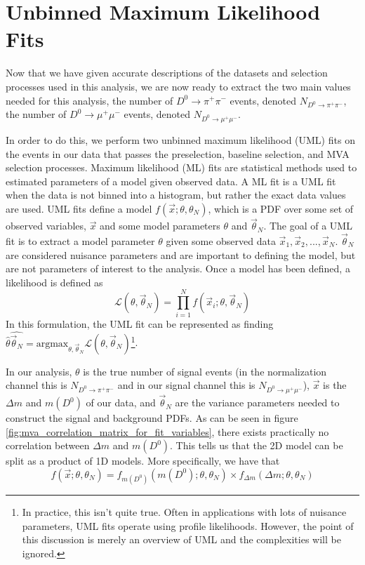 \section{Unbinned Maximum Likelihood Fits}
\label{sec:UML}

Now that we have given accurate descriptions of the datasets and selection processes used in this analysis, we are now ready to extract the two main values needed for this analysis, the number of $D^0 \to \pi^+ \pi^-$ events, denoted $N_{D^0 \to \pi^+ \pi^-}$, the number of $D^0 \to \mu^+ \mu^-$ events, denoted $N_{D^0 \to \mu^+ \mu^-}$.

In order to do this, we perform two unbinned maximum likelihood (UML) fits on the events in our data that passes the preselection, baseline selection, and MVA selection processes. Maximum likelihood (ML) fits are statistical methods used to estimated parameters of a model given observed data. A ML fit is a UML fit when the data is not binned into a histogram, but rather the exact data values are used. UML fits define a model $f(\vec{x}; \theta, \theta_N)$, which is a PDF over some set of observed variables, $\vec{x}$ and some model parameters $\theta$ and $\vec{\theta}_N$. The goal of a UML fit is to extract a model parameter $\theta$ given some observed data $\vec{x}_1, \vec{x}_2,...,\vec{x}_N$. $\vec{\theta}_N$ are considered nuisance parameters and are important to defining the model, but are not parameters of interest to the analysis. Once a model has been defined, a likelihood is defined as
\begin{equation}
    \mathcal{L}(\theta, \vec{\theta}_N) = \prod^N_{i=1} f(\vec{x}_i; \theta, \vec{\theta}_N)
\end{equation}
In this formulation, the UML fit can be represented as finding $\hat{\theta} \hat{\vec{\theta}_N}= \text{argmax}_{\theta, \vec{\theta}_N} \mathcal{L}(\theta, \vec{\theta}_N)$\footnote{In practice, this isn't quite true. Often in applications with lots of nuisance parameters, UML fits operate using profile likelihoods. However, the point of this discussion is merely an overview of UML and the complexities will be ignored.}. 

In our analysis, $\theta$ is the true number of signal events (in the normalization channel this is $N_{D^0 \to \pi^+ \pi^-}$ and in our signal channel this is $N_{D^0 \to \mu^+ \mu^-}$), $\vec{x}$ is the $\Delta m$ and $m(D^0)$ of our data, and $\vec{\theta}_N$ are the variance parameters needed to construct the signal and background PDFs. As can be seen in figure \ref{fig:mva_correlation_matrix_for_fit_variables}, there exists practically no correlation between $\Delta m$ and $m(D^0)$. This tells us that the 2D model can be split as a product of 1D models. More specifically, we have that
\begin{equation}
    f(\vec{x}; \theta, \theta_N) = f_{m(D^0)}(m(D^0); \theta, \theta_N) \times f_{\Delta m}(\Delta m; \theta, \theta_N)
\end{equation}

